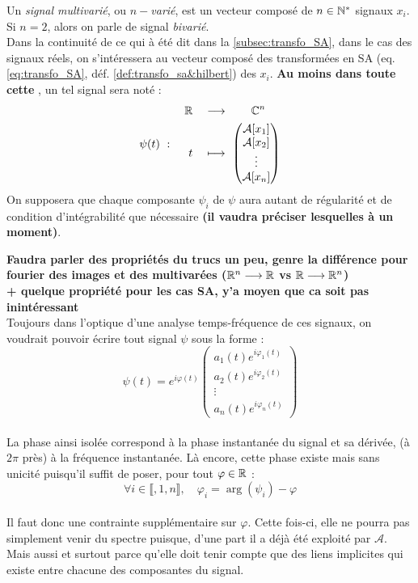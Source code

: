\begin{definition}\label{def:signal_multivar}
	Un \emph{signal multivarié}, ou \emph{$n-$varié}, est un vecteur composé de $n\in\mathbb{N}^*$ signaux $x_i$. Si $n=2$, alors on parle de signal \emph{bivarié}.
	\\
	Dans la continuité de ce qui à été dit dans la \cref{subsec:transfo_SA}, dans le cas des signaux réels, on s'intéressera au vecteur composé des transformées en SA (eq. \ref{eq:transfo_SA}, déf. \ref{def:transfo_sa&hilbert}) des $x_i$.
	\textbf{Au moins dans toute cette }, un tel signal sera noté :
	\[\psi(t)\ :\quad \begin{aligned} 
		\R\quad &\lr\qquad \C^n \\t\quad &\longmapsto\ \begin{pmatrix} \mathcal{A}[x_1] \\ 
		\mathcal{A}[x_2] \\ \vdots \\ \mathcal{A}[x_n] \end{pmatrix}
	\end{aligned} \]
	On supposera que chaque composante $\psi_i$ de $\psi$ aura autant de régularité et de condition d'intégrabilité que nécessaire \textbf{(il vaudra préciser lesquelles à un moment)}.
\end{definition}

\textbf{Faudra parler des propriétés du trucs un peu, genre la différence pour fourier des images et des multivarées ($\mathbb{R}^n\longrightarrow\mathbb{R}$ vs $\mathbb{R}\longrightarrow\mathbb{R}^n$)}
\\
\textbf{+ quelque propriété pour les cas SA, y'a moyen que ca soit pas inintéressant}
\\

Toujours dans l'optique d'une analyse temps-fréquence de ces signaux, on voudrait pouvoir écrire tout signal $\psi$ sous la forme :
\[\psi(t) = e^{i\varphi(t)}\begin{pmatrix} a_1(t)e^{i\varphi_1(t)} \\ a_2(t)e^{i\varphi_2(t)} \\ \vdots \\ a_n(t)e^{i\varphi_n(t)}
\end{pmatrix}\]
\\
La phase ainsi isolée correspond à la phase instantanée du signal et sa dérivée, (à $2\pi$ près) à la fréquence instantanée. Là encore, cette phase existe mais sans unicité puisqu'il suffit de poser, pour tout $\varphi\in\mathbb{R}$ :
\[\forall i\in\llbracket, 1,n\rrbracket,\quad \varphi_i = \arg(\psi_i)-\varphi\]
\\
Il faut donc une contrainte supplémentaire sur $\varphi$. Cette fois-ci, elle ne pourra pas simplement venir du spectre puisque, d'une part il a déjà été exploité par $\mathcal{A}$. Mais aussi et surtout parce qu'elle doit tenir compte que des liens implicites qui existe entre chacune des composantes du signal.


